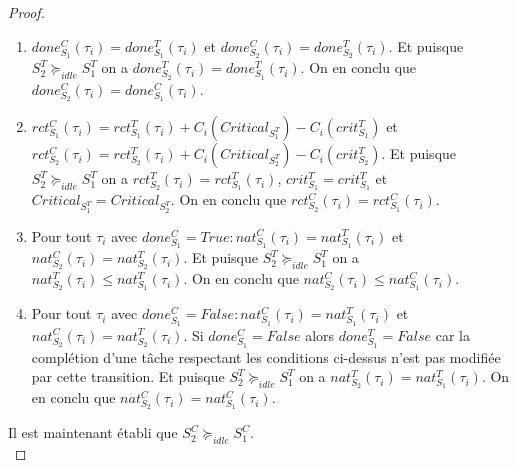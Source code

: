 \documentclass[a4paper]{report}
\theoremstyle{break}
\theoremstyle{breakplain}
\begin{document}
\begin{proof}
\begin{enumerate}
\begin{enumerate}[label=(\alph*)]
\item $done_{S_1}^C(\tau_i) = done_{S_1}^T(\tau_i)$ et $done_{S_2}^C(\tau_i) = done_{S_2}^T(\tau_i)$. Et puisque $S^T_2 \succeq_{idle} S^T_1$ on a $done_{S_2}^T(\tau_i)= done_{S_1}^T(\tau_i)$. On en conclu que $done_{S_2}^C(\tau_i) = done_{S_1}^C(\tau_i)$.


\item $rct_{S_1}^C(\tau_i) = rct_{S_1}^T(\tau_i)+C_i(Critical_{S_1^T})-C_i(crit_{S_1}^T)$ et $rct_{S_2}^C(\tau_i) = rct_{S_2}^T(\tau_i)+C_i(Critical_{S_2^T})-C_i(crit_{S_2}^T)$. Et puisque $S^T_2 \succeq_{idle} S^T_1$ on a $rct_{S_2}^T(\tau_i) = rct_{S_1}^T(\tau_i)$, $crit_{S_1}^T = crit_{S_1}^T$ et $Critical_{S_1^T} = Critical_{S_2^T}$. On en conclu que $rct_{S_2}^C(\tau_i) = rct_{S_1}^C(\tau_i)$.



\item Pour tout $\tau_i$ avec $done^C_{S_1} = True : nat_{S_1}^C(\tau_i) = nat_{S_1}^T(\tau_i)$ et $nat_{S_2}^C(\tau_i) = nat_{S_2}^T(\tau_i)$. Et puisque $S^T_2 \succeq_{idle} S^T_1$ on a $nat_{S_2}^T(\tau_i)\leq nat_{S_1}^T(\tau_i)$. On en conclu que $nat_{S_2}^C(\tau_i) \leq nat_{S_1}^C(\tau_i)$.

\item Pour tout $\tau_i$ avec $done^C_{S_1} = False : nat_{S_1}^C(\tau_i) = nat_{S_1}^T(\tau_i)$ et $nat_{S_2}^C(\tau_i) = nat_{S_2}^T(\tau_i)$. Si $done^C_{S_1} = False$ alors $done^T_{S_1} = False$ car la complétion d'une tâche respectant les conditions ci-dessus n'est pas modifiée par cette transition.  Et puisque $S^T_2 \succeq_{idle} S^T_1$ on a $nat_{S_2}^T(\tau_i)= nat_{S_1}^T(\tau_i)$. On en conclu que $nat_{S_2}^C(\tau_i) = nat_{S_1}^C(\tau_i)$.
\end{enumerate}

\end{enumerate}
Il est maintenant établi que $S^C_2 \succeq_{idle} S^C_1$.\\


\end{proof}
\end{document}

